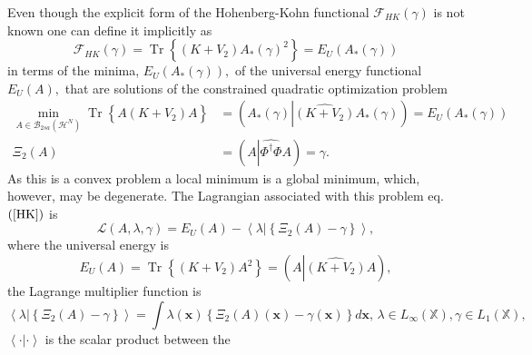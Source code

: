 \documentclass[aps,preprint]{revtex4}%
\begin{document}
Even though the explicit form of the Hohenberg-Kohn functional $\mathcal{F}%
_{HK}\left(  \gamma\right)  $ is not known one can define it implicitly
\cite{LevyLieb} as
\begin{equation}
\mathcal{F}_{HK}\left(  \gamma\right)  =\operatorname{Tr}\left\{  \left(
K+V_{2}\right)  A_{\ast}\left(  \gamma\right)  ^{2}\right\}  =E_{U}\left(
A_{\ast}\left(  \gamma\right)  \right)
\end{equation}
in terms of the minima, $E_{U}\left(  A_{\ast}\left(  \gamma\right)  \right)
,$ of the universal energy functional $E_{U}\left(  A\right)  ,$ that are
solutions of the constrained quadratic optimization problem
\begin{align}
\min_{A\in\mathcal{B}_{2sa}\left(  \mathcal{H}^{N}\right)  }\operatorname{Tr}%
\left\{  A\overset{}{\left(  K+V_{2}\right)  A}\right\}   &  =\left(  A_{\ast
}\left(  \gamma\right)  \left\vert \widehat{\left(  K+V_{2}\right)  }A_{\ast
}\left(  \gamma\right)  \right.  \right)  =E_{U}\left(  A_{\ast}\left(
\gamma\right)  \right) \nonumber\\
\Xi_{2}\left(  A\right)   &  =\left(  A\left\vert \widehat{\Phi^{\dagger}\Phi
}A\right.  \right)  =\gamma. \label{HKQ}%
\end{align}
As this is a convex problem a local minimum is a global minimum, which,
however, may be degenerate. The Lagrangian associated with this problem eq.
$\left(  \ref{HK}\right)  $ is
\begin{equation}
\mathcal{L}\left(  A,\lambda,\gamma\right)  =E_{U}\left(  A\right)
-\left\langle \left.  \lambda\right\vert \left\{  \Xi_{2}\left(  A\right)
-\gamma\right\}  \right\rangle , \label{Lar}%
\end{equation}
where the universal energy is
\begin{equation}
E_{U}\left(  A\right)  =\operatorname{Tr}\left\{  \left(  K+V_{2}\right)
A^{2}\right\}  =\left(  A\left\vert \widehat{\left(  K+V_{2}\right)
}A\right.  \right)  ,
\end{equation}
the Lagrange multiplier function is
\begin{equation}
\left\langle \left.  \lambda\right\vert \left\{  \Xi_{2}\left(  A\right)
-\gamma\right\}  \right\rangle =\int\lambda\left(  \boldsymbol{x}\right)
\left\{  \Xi_{2}\left(  A\right)  \left(  \boldsymbol{x}\right)
-\gamma\left(  \boldsymbol{x}\right)  \right\}  d\boldsymbol{x,\,}\lambda\in
L_{\infty}\left(  \mathbb{X}\right)  ,\gamma\in L_{1}\left(  \mathbb{X}%
\right)  ,
\end{equation}
$\left\langle \cdot|\cdot\right\rangle $ is the scalar product between the
\end{document}
